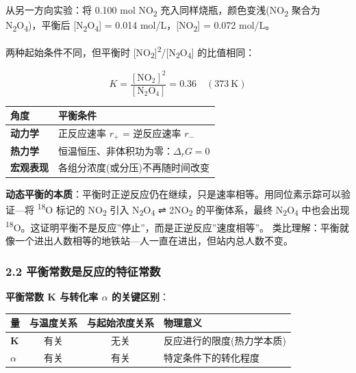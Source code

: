 从另一方向实验：将 0.100 mol NO\textsubscript{2} 充入同样烧瓶，颜色变浅(NO\textsubscript{2} 聚合为 N\textsubscript{2}O\textsubscript{4})，平衡后 {[}N\textsubscript{2}O\textsubscript{4}{]} = 0.014 mol/L，{[}NO\textsubscript{2}{]} = 0.072 mol/L。

两种起始条件不同，但平衡时 {[}NO\textsubscript{2}{]}\textsuperscript{2}/{[}N\textsubscript{2}O\textsubscript{4}{]} 的比值相同：

\[
K = \frac{[\mathrm{NO_2}]^2}{[\mathrm{N_2O_4}]} = 0.36 \quad (373\ \mathrm{K})
\]

{\def\LTcaptype{none} %
\begin{longtable}[]{@{}ll@{}}
\toprule\noalign{}
角度 & 平衡条件 \\
\midrule\noalign{}
\endhead
\bottomrule\noalign{}
\endlastfoot
\textbf{动力学} & 正反应速率 \(r_+\) = 逆反应速率 \(r_-\) \\
\textbf{热力学} & 恒温恒压、非体积功为零：\(\Delta_rG = 0\) \\
\textbf{宏观表现} & 各组分浓度(或分压)不再随时间改变 \\
\end{longtable}
}

\textbf{动态平衡的本质}：平衡时正逆反应仍在继续，只是速率相等。用同位素示踪可以验证---将 \textsuperscript{18}O 标记的 NO\textsubscript{2} 引入 N\textsubscript{2}O\textsubscript{4} ⇌ 2NO\textsubscript{2} 的平衡体系，最终 N\textsubscript{2}O\textsubscript{4} 中也会出现 \textsuperscript{18}O。这证明平衡不是反应''停止''，而是正逆反应''速度相等''。
类比理解：平衡就像一个进出人数相等的地铁站---人一直在进出，但站内总人数不变。

\subsubsection{2.2 平衡常数是反应的特征常数}\label{ux5e73ux8861ux5e38ux6570ux662fux53cdux5e94ux7684ux7279ux5f81ux5e38ux6570}

\textbf{平衡常数 K 与转化率 \(\alpha\) 的关键区别}：

{\def\LTcaptype{none} %
\begin{longtable}[]{@{}lccl@{}}
\toprule\noalign{}
量 & 与温度关系 & 与起始浓度关系 & 物理意义 \\
\midrule\noalign{}
\endhead
\bottomrule\noalign{}
\endlastfoot
\textbf{K} & 有关 & 无关 & 反应进行的限度(热力学本质) \\
\textbf{\(\alpha\)} & 有关 & 有关 & 特定条件下的转化程度 \\
\end{longtable}
}


